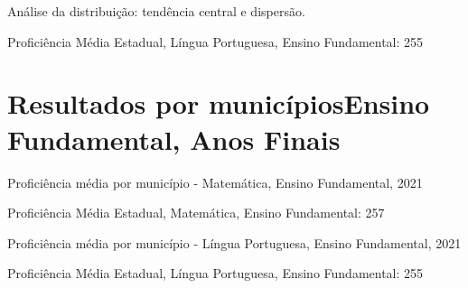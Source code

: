 \documentclass[
  ignorenonframetext,
]{beamer}
\begin{document}
\begin{frame}
Análise da distribuição: tendência central e dispersão.

Proficiência Média Estadual, Língua Portuguesa, Ensino Fundamental: 255
\end{frame}

\hypertarget{resultados-por-municuxedpios-ensino-fundamental-anos-finais}{%
\section{\texorpdfstring{Resultados por municípiosEnsino Fundamental,
Anos
Finais}{Resultados por municípios  Ensino Fundamental, Anos Finais}}\label{resultados-por-municuxedpios-ensino-fundamental-anos-finais}}

\begin{frame}
Proficiência média por município - Matemática, Ensino Fundamental, 2021

Proficiência Média Estadual, Matemática, Ensino Fundamental: 257
\end{frame}

\begin{frame}
Proficiência média por município - Língua Portuguesa, Ensino
Fundamental, 2021

Proficiência Média Estadual, Língua Portuguesa, Ensino Fundamental: 255
\end{frame}
\end{document}
